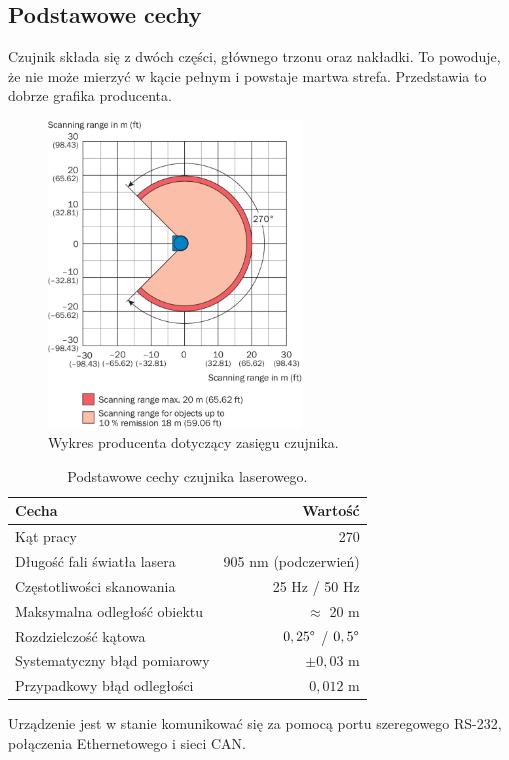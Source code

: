 	\subsection{Podstawowe cechy}
	Czujnik składa się z dwóch części, głównego trzonu oraz nakładki.
	To powoduje, że nie może mierzyć w kącie pełnym i powstaje martwa strefa.
	Przedstawia to dobrze grafika producenta.
	\begin{figure}[H]
	\centering
	\includegraphics[width=0.6\textwidth]{graphics/sick.png}
	\caption{Wykres producenta dotyczący zasięgu czujnika.}
	\label{fig:lidar}
	\end{figure} 
	\begin{table}
	\centering
	\begin{tabular}{l r}
	Cecha & Wartość \\
	\hline
	Kąt pracy & 270\textdegree \\
	Długość fali światła lasera & 905 nm (podczerwień) \\
	Częstotliwości skanowania & 25 Hz / 50 Hz \\
	Maksymalna odległość obiektu & $\approx$ 20 m \\
	Rozdzielczość kątowa & $0,25 \degree$ / $0,5 \degree $ \\
	Systematyczny błąd pomiarowy & $\pm 0,03$ m \\
	Przypadkowy błąd odległości & $0,012$ m \\
	\end{tabular}
	\caption{Podstawowe cechy czujnika laserowego.}
	\label{tab:lidar}
	\end{table}
	Urządzenie jest w stanie komunikować się za pomocą portu szeregowego RS-232, połączenia Ethernetowego i sieci CAN.

